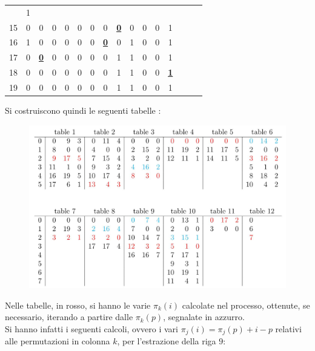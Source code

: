 \begin{esempio}
\begin{table}[H]
\begin{tabular}{c|ccccccccccccccc}
                                                               & 1 \\
      15 & 0 & 0 & 0 & 0 & 0 & 0 & 0 & {\color{nordred}\textbf{\underline{0}}} & 0 & 0 & 0
                                                               & 1 \\
      16 & 1 & 0 & 0 & 0 & 0 & 0 & {\color{nordred}\textbf{\underline{0}}} & 0 & 1 & 0 & 0
                                                               & 1 \\
      17 & 0 & {\color{nordred}\textbf{\underline{0}}} & 0 & 0 & 0 & 0 & 0 & 1 & 1 & 0 & 0
                                                               & 1 \\
      18 & 0 & 0 & 0 & 0 & 0 & 0 & 0 & 1 & 1 & 0 & 0
                                         & {\color{nordred}\textbf{\underline{1}}} \\ 
      19 & 0 & 0 & 0 & 0 & 0 & 0 & 0 & 1 & 1 & 0 & 0 & 1 \\
    \end{tabular}
  \end{table}
  Si costruiscono quindi le seguenti tabelle \cite{tricks}:
   \begin{figure}[H]
    \centering
    \includegraphics[scale=0.3]{img/trick.jpg}
  \end{figure}
  Nelle tabelle, in rosso, si hanno le varie $\pi_k(i)$ calcolate nel processo,
  ottenute, 
  se necessario, iterando a partire dalle $\pi_k(p)$, segnalate in azzurro. \\
  Si hanno infatti i seguenti calcoli, ovvero i vari $\pi_j(i)=\pi_j(p)+i-p$ 
  relativi alle permutazioni in colonna $k$, per l'estrazione della riga $9$:
  \begin{multicols}{2}
    \begin{itemize}

\end{itemize}
\end{multicols}
\end{esempio}
